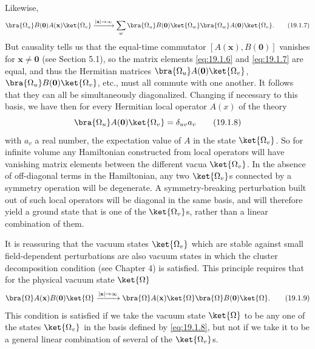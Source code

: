 Likewise,
\begin{equation}
 \bra{\Omega_u}B(\mathbf 0)A(\mathbf x)\ket{\Omega_v}
 \xrightarrow{\lvert\mathbf x\rvert\to\infty}
 \sum_w\bra{\Omega_u}B(\mathbf 0)\ket{\Omega_w}
 \bra{\Omega_w}A(\mathbf 0)\ket{\Omega_v}.
 \tag{19.1.7}\label{eq:19.1.7}
\end{equation}
But causality tells us that the equal-time commutator
$[A(\mathbf x),B(\mathbf 0)]$ vanishes for $\mathbf x\ne\mathbf 0$ (see
Section 5.1), so the matrix elements \eqref{eq:19.1.6} and
\eqref{eq:19.1.7} are equal, and thus the Hermitian matrices
$\bra{\Omega_u}A(\mathbf 0)\ket{\Omega_v}$,
$\bra{\Omega_u}B(\mathbf 0)\ket{\Omega_v}$, etc., must all commute with one
another. It follows that they can all be simultaneously diagonalized.
Changing if necessary to this basis, we have then for every Hermitian local
operator $A(x)$ of the theory
\begin{equation}
 \bra{\Omega_u}A(\mathbf 0)\ket{\Omega_v}=\delta_{uv}a_v
 \tag{19.1.8}\label{eq:19.1.8}
\end{equation}
with $a_v$ a real number, the expectation value of $A$ in the state
$\ket{\Omega_v}$. So for infinite volume any Hamiltonian constructed from
local operators will have vanishing matrix elements between the different
vacua $\ket{\Omega_v}$. In the absence of off-diagonal terms in the
Hamiltonian, any two $\ket{\Omega_v}$s connected by a symmetry operation
will be degenerate. A symmetry-breaking perturbation built out of such local
operators will be diagonal in the same basis, and will therefore yield a
ground state that is one of the $\ket{\Omega_v}$s, rather than a linear
combination of them.

It is reassuring that the vacuum states $\ket{\Omega_v}$ which are stable
against small field-dependent perturbations are also vacuum states in which
the cluster decomposition condition (see Chapter 4) is satisfied. This
principle requires that for the physical vacuum state $\ket{\Omega}$
\begin{equation}
 \bra{\Omega}A(\mathbf x)B(\mathbf 0)\ket{\Omega}
 \xrightarrow{\lvert\mathbf x\rvert\to\infty}
 \bra{\Omega}A(\mathbf x)\ket{\Omega}
 \bra{\Omega}B(\mathbf 0)\ket{\Omega}.
 \tag{19.1.9}\label{eq:19.1.9}
\end{equation}
This condition is satisfied if we take the vacuum state $\ket{\Omega}$ to be
any one of the states $\ket{\Omega_v}$ in the basis defined by
\eqref{eq:19.1.8}, but not if we take it to be a general linear combination
of several of the $\ket{\Omega_v}$s.
